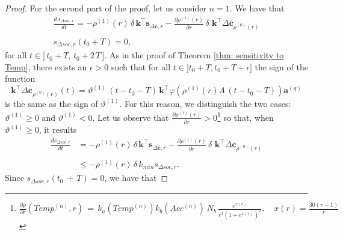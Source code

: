\begin{proof}
\bigskip 
\noindent For the second part of the proof, let us consider $n=1.$ We have that
$$\begin{array}{l}
\displaystyle \frac{d\,s_{\Delta soc,r}}{dt} = -\rho^{(1)}(r)\,\delta\,\mathbf{k}^\intercal \mathbf{s}_{\Delta \mathbf{\overline c},r}- \displaystyle \frac{\partial\rho^{(1)}(r)}{\partial r}\,\delta\, \,\mathbf{k}^\intercal \Delta \mathbf{\overline c}_{\rho^{(0)}(r)} \\\\
s_{\Delta soc,r}(t_0+T)=0,
\end{array}
$$
for all $t\in]\,t_0+T,\,t_0+2\,T\,]$. As in the proof of Theorem \ref{thm: sensitivity to Temp}, there exists an $ \epsilon>0$ such that for all $t\in]t_0+T, t_0+T+ \epsilon]$ the sign of the function
$$
\mathbf{k}^\intercal \Delta \mathbf{\overline c}_{\rho^{(0)}(r)}(t) = 
\vartheta^{(1)}\,(t-t_0-T)\,\mathbf{k}^\intercal \varphi\left( \rho^{(1)}(r) A\,(t-t_0-T)\right)\mathbf{a}^{(g)}
$$
is the same as the sign of $\vartheta^{(1)}$.
For this reason, we distinguish the two cases: $\vartheta^{(1)}\geq 0$ and $\vartheta^{(1)} < 0$.  Let us observe that $\displaystyle \frac{\partial\rho^{(1)}(r)}{\partial r}>0$\footnote{$\displaystyle \frac{\partial\rho}{\partial r}(Temp^{(n)},r)\,=\, k_a(Temp^{(n)})k_b({Acc^{(n)}})\, N_b\, \displaystyle \frac{e^{x(r)}}{r^2\left( 1+e^{x(r)}\right)^2},\quad x(r)=\displaystyle \frac{30(r-1)}{r}$} so that, when  $\vartheta^{(1)}\geq 0$, it results
$$\begin{array}{ll}
\displaystyle \frac{ds_{\Delta soc,r}}{dt} &= -\rho^{(1)}(r)\,\delta\,\mathbf{k}^\intercal \mathbf{s}_{\Delta \mathbf{\overline c},r}- \displaystyle \frac{\partial\rho^{(1)}(r)}{\partial r}\,\delta\, \,\mathbf{k}^\intercal \Delta \mathbf{\overline c}_{\rho^{(0)}(r)} \\\\
&\leq  -\rho^{(1)}(r)\,\delta\,k_{min}s_{\Delta soc,r}.
\end{array}$$
Since $s_{\Delta soc,r}(t_0\,+\,T)= 0$, we have that 

\end{proof}
